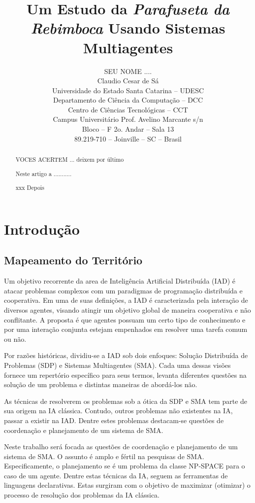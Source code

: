 \documentclass[12pt,final,a4paper]{article}
\title{Um Estudo da \textit{Parafuseta da Rebimboca} Usando Sistemas Multiagentes}
\author{SEU NOME ....\\     
Claudio Cesar de Sá\\
Universidade do Estado Santa Catarina -- UDESC\\
Departamento de Ciência da Computação -- DCC\\
Centro de Ciências Tecnológicas -- CCT\\
Campus Universitário Prof. Avelino Marcante s/n\\
Bloco -- F  2o. Andar -- Sala 13\\
89.219-710 -- Joinville -- SC -- Brasil
}
\theoremstyle{definition}
\begin{document}
\maketitle

\begin{abstract}
VOCES ACERTEM ... deixem por último

Neste artigo a ...........

\end{abstract}


\begin{abstract}
xxx Depois

\end{abstract}


\section{Introdução}
\label{sec_introducao}

\subsection{Mapeamento do Territ\'orio}

Um objetivo recorrente  da area de Inteligência Artificial Distribuída (IAD)  é atacar problemas complexos com um paradigmas de programação distribuída e cooperativa. Em uma de suas definições, a IAD é caracterizada pela interação de diversos  agentes, visando atingir um objetivo global de maneira cooperativa e não conflitante.  A proposta é que agentes possuam um certo tipo de conhecimento e por uma interação conjunta estejam empenhados em resolver uma tarefa comum ou não.

Por razões históricas, dividiu-se a IAD sob dois enfoques: Solução Distribuída de Problemas (SDP) e Sistemas Multiagentes (SMA). Cada uma dessas visões fornece um repertório específico para seus termos, levanta diferentes questões na solução de um problema e distintas maneiras de abordá-los não.

As técnicas de resolverem os problemas sob a ótica da SDP e SMA tem parte de sua origem na IA clássica. Contudo, outros problemas não existentes na IA, passar a existir na IAD. Dentre estes problemas destacam-se questões de coordenação e planejamento de um sistema de SMA.

Neste trabalho será focada as questões de  coordenação e planejamento de um sistema de SMA. O assunto é amplo e fértil na pesquisas de SMA. Especificamente, o planejamento se é um problema da classe NP-SPACE para o caso de um agente.  Dentre estas técnicas da IA, seguem as ferramentas de linguagens  declarativas. Estas surgiram com o objetivo
de maximizar (otimizar) o processo de resolução dos problemas da IA clássica.
\end{document}
